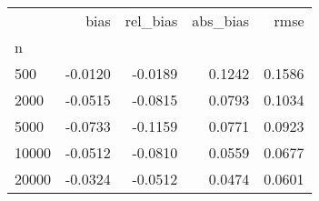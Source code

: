 \begin{tabular}{lrrrr}
\toprule
{} &    bias &  rel\_bias &  abs\_bias &   rmse \\
n     &         &           &           &        \\
\midrule
500   & -0.0120 &   -0.0189 &    0.1242 & 0.1586 \\
2000  & -0.0515 &   -0.0815 &    0.0793 & 0.1034 \\
5000  & -0.0733 &   -0.1159 &    0.0771 & 0.0923 \\
10000 & -0.0512 &   -0.0810 &    0.0559 & 0.0677 \\
20000 & -0.0324 &   -0.0512 &    0.0474 & 0.0601 \\
\bottomrule
\end{tabular}

